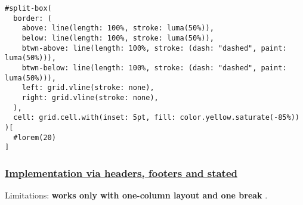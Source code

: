 \begin{verbatim}
#split-box(
  border: (
    above: line(length: 100%, stroke: luma(50%)),
    below: line(length: 100%, stroke: luma(50%)),
    btwn-above: line(length: 100%, stroke: (dash: "dashed", paint: luma(50%))),
    btwn-below: line(length: 100%, stroke: (dash: "dashed", paint: luma(50%))),
    left: grid.vline(stroke: none),
    right: grid.vline(stroke: none),
  ),
  cell: grid.cell.with(inset: 5pt, fill: color.yellow.saturate(-85%))
)[
  #lorem(20)
]
\end{verbatim}

\pandocbounded{}

\subsubsection{\texorpdfstring{\hyperref[implementation-via-headers-footers-and-stated]{Implementation
via headers, footers and
stated}}{Implementation via headers, footers and stated}}\label{implementation-via-headers-footers-and-stated}

Limitations: \textbf{works only with one-column layout and one break} .

